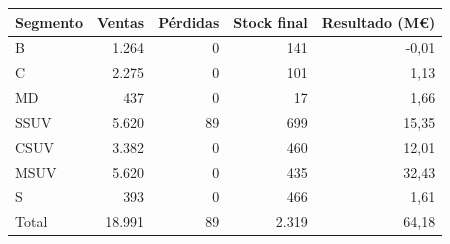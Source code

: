 \begin{tabular}{lrrrr}
\toprule
Segmento & Ventas & Pérdidas & Stock final & Resultado (M€) \\
\midrule
B & 1.264 & 0 & 141 & -0,01 \\
C & 2.275 & 0 & 101 & 1,13 \\
MD & 437 & 0 & 17 & 1,66 \\
SSUV & 5.620 & 89 & 699 & 15,35 \\
CSUV & 3.382 & 0 & 460 & 12,01 \\
MSUV & 5.620 & 0 & 435 & 32,43 \\
S & 393 & 0 & 466 & 1,61 \\
Total & 18.991 & 89 & 2.319 & 64,18 \\
\bottomrule
\end{tabular}
